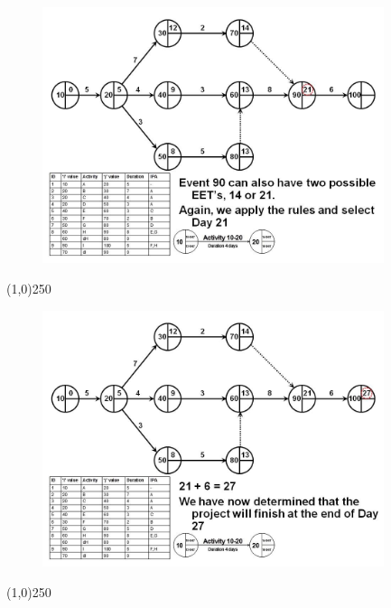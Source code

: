 \begin{frame}
\begin{figure}
	\centering
		\includegraphics[width = 10.0cm]{oldnotes/Slide109.jpg}
\end{figure}
\end{frame}
\begin{center}\line(1,0){250}\end{center}


\begin{frame}
\begin{figure}
	\centering
		\includegraphics[width = 10.0cm]{oldnotes/Slide110.jpg}
\end{figure}
\end{frame}
\begin{center}\line(1,0){250}\end{center}


